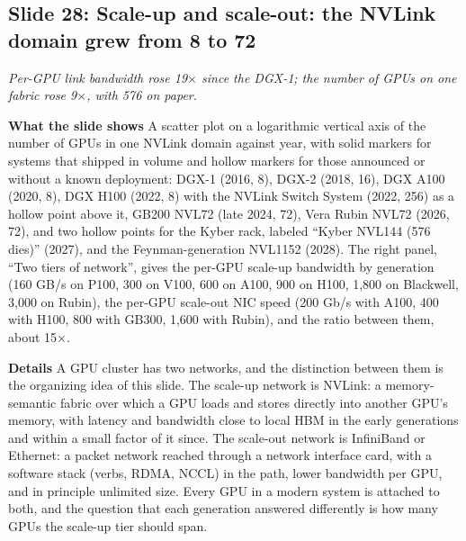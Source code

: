 \documentclass[11pt,letterpaper]{article}
\newcommand{\slide}[3]{%
  \subsection[Slide #1: #2]{Slide #1: #2}%
  {\color{muted}\itshape #3\par}\medskip}
\newcommand{\para}[1]{\medskip\noindent\textbf{#1}\quad}
\begin{document}
\slide{28}{Scale-up and scale-out: the NVLink domain grew from 8 to 72}{Per-GPU link bandwidth rose 19$\times$ since the DGX-1; the number of GPUs on one fabric rose 9$\times$, with 576 on paper.}

\para{What the slide shows} A scatter plot on a logarithmic vertical axis of the number of GPUs in one NVLink domain against year, with solid markers for systems that shipped in volume and hollow markers for those announced or without a known deployment: DGX-1 (2016, 8), DGX-2 (2018, 16), DGX A100 (2020, 8), DGX H100 (2022, 8) with the NVLink Switch System (2022, 256) as a hollow point above it, GB200 NVL72 (late 2024, 72), Vera Rubin NVL72 (2026, 72), and two hollow points for the Kyber rack, labeled ``Kyber NVL144 (576 dies)'' (2027), and the Feynman-generation NVL1152 (2028). The right panel, ``Two tiers of network'', gives the per-GPU scale-up bandwidth by generation (160 GB/s on P100, 300 on V100, 600 on A100, 900 on H100, 1,800 on Blackwell, 3,000 on Rubin), the per-GPU scale-out NIC speed (200 Gb/s with A100, 400 with H100, 800 with GB300, 1,600 with Rubin), and the ratio between them, about 15$\times$.

\para{Details} A GPU cluster has two networks, and the distinction between them is the organizing idea of this slide. The scale-up network is NVLink: a memory-semantic fabric over which a GPU loads and stores directly into another GPU's memory, with latency and bandwidth close to local HBM in the early generations and within a small factor of it since. The scale-out network is InfiniBand or Ethernet: a packet network reached through a network interface card, with a software stack (verbs, RDMA, NCCL) in the path, lower bandwidth per GPU, and in principle unlimited size. Every GPU in a modern system is attached to both, and the question that each generation answered differently is how many GPUs the scale-up tier should span.
\end{document}
